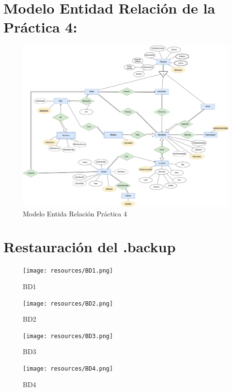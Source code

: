 \section{Modelo Entidad Relación de la Práctica 4:}
\begin{figure}[h]
    \centering
    \includegraphics[width=1.1\textwidth]{resources/ModeloEntidad_Relación.png}
    \caption{Modelo Entida Relación Práctica 4}
\end{figure}

\clearpage

\section{Restauración del .backup}
\begin{figure}[h]
    \centering
    \texttt{[image: resources/BD1.png]}
    \caption{BD1}
\end{figure}

\begin{figure}[h]
    \centering
    \texttt{[image: resources/BD2.png]}
    \caption{BD2}
\end{figure}

\begin{figure}[h]
    \centering
    \texttt{[image: resources/BD3.png]}
    \caption{BD3}
\end{figure}

\begin{figure}[h]
    \centering
    \texttt{[image: resources/BD4.png]}
    \caption{BD4}
\end{figure}

